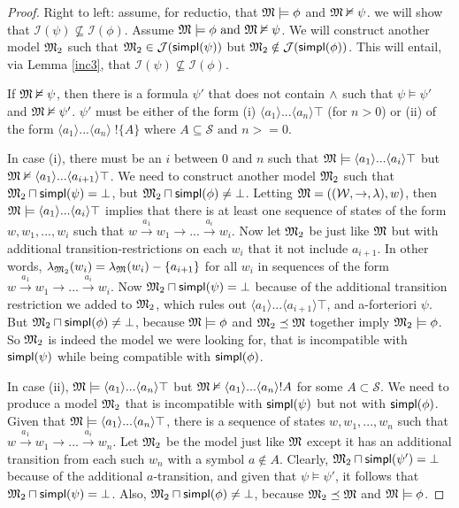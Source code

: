 \begin{proof}
Right to left: assume, for reductio, that $\frak{M} \models \phi$ and $\frak{M} \nvDash
\psi$. we will show that $\mathcal{I}(\psi) \nsubseteq \mathcal{I}(\phi)$.
Assume $\frak{M} \models \phi \mbox{ and } \frak{M} \nvDash \psi$. We will construct
another model $\frak{M}_2$ such that $\frak{M}_2 \in \mathcal{J}(\mathsf{simpl}(\psi))$ but $\frak{M}_2
\notin \mathcal{J}(\mathsf{simpl}(\phi))$.  This will entail, via Lemma \ref{inc3}, that
$\mathcal{I}(\psi) \nsubseteq \mathcal{I}(\phi)$.

If $\frak{M} \nvDash \psi$, then there is a formula $\psi'$ that does not contain
$\land$ such that $\psi \models \psi'$ and $\frak{M} \nvDash \psi'$. $\psi'$ must be
either of the form (i) $\langle a_1 \rangle ... \langle a_n \rangle
\top$ (for $n > 0$) or (ii) of the form $\langle a_1 \rangle
... \langle a_n \rangle \; !\{A\}$ where $A \subseteq \mathcal{S}
\mbox{ and } n >= 0$.

In case (i), there must be an $i$ between $0$ and $n$ such that $\frak{M}
\models \langle a_1 \rangle ... \langle a_i \rangle \top$ but $\frak{M}
\nvDash \langle a_1 \rangle ... \langle a_{i+1} \rangle \top$. We need
to construct another model $\frak{M}_2$ such that $\frak{M}_2 \sqcap \mathsf{simpl}(\psi) = \bot$,
but $\frak{M}_2 \sqcap \mathsf{simpl}(\phi) \neq \bot$. Letting $\frak{M} =
((\mathcal{W},\rightarrow,\lambda),w)$, then $\frak{M} \models \langle a_1
\rangle ... \langle a_i \rangle \top$ implies that there is at least
one sequence of states of the form $w, w_1, ..., w_i$ such that $w
\xrightarrow{a_1} w_1 \rightarrow ... \xrightarrow{a_i} w_i$.  Now let
$\frak{M}_2$ be just like $\frak{M}$ but with additional transition-restrictions on
each $w_i$ that it not include $a_{i+1}$.  In other words,
$\lambda_{\frak{M}_2}(w_i) = \lambda_\frak{M}(w_i) - \{a_{i+1}\}$ for all $w_i$ in
sequences of the form $w \xrightarrow{a_1} w_1 \rightarrow
... \xrightarrow{a_i} w_i$. Now $\frak{M}_2 \sqcap \mathsf{simpl}(\psi) = \bot$ because of
the additional transition restriction we added to $\frak{M}_2$, which rules out
$\langle a_1 \rangle ... \langle a_{i+1} \rangle \top$, and
a-forteriori $\psi$. But $\frak{M}_2 \sqcap \mathsf{simpl}(\phi) \neq \bot$, because $\frak{M}
\models \phi$ and $\frak{M}_2 \preceq \frak{M}$ together imply $\frak{M}_2 \models \phi$. So $\frak{M}_2$ is
indeed the model we were looking for, that is incompatible with
$\mathsf{simpl}(\psi)$ while being compatible with $\mathsf{simpl}(\phi)$.

In case (ii), $\frak{M} \models \langle a_1 \rangle ... \langle a_n \rangle
\top$ but $\frak{M} \nvDash \langle a_1 \rangle ... \langle a_n \rangle !A$
for some $A \subset \mathcal{S}$. We need to produce a model $\frak{M}_2$ that
is incompatible with $\mathsf{simpl}(\psi)$ but not with $\mathsf{simpl}(\phi)$. Given that
$\frak{M} \models \langle a_1 \rangle ... \langle a_n \rangle \top$, there is
a sequence of states $w, w_1, ..., w_n$ such that $w \xrightarrow{a_1}
w_1 \rightarrow ... \xrightarrow{a_i} w_n$. Let $\frak{M}_2$ be the model just
like $\frak{M}$ except it has an additional transition from each such $w_n$
with a symbol $a \notin A$. 
Clearly, $\frak{M}_2 \sqcap \mathsf{simpl}(\psi') = \bot$
because of the additional $a$-transition, and given that $\psi \models
\psi'$, it follows that $\frak{M}_2 \sqcap \mathsf{simpl}(\psi) = \bot$. Also, $\frak{M}_2 \sqcap
\mathsf{simpl}(\phi) \neq \bot$, because $\frak{M}_2 \preceq \frak{M}$ and $\frak{M} \models \phi$.


\end{proof}

